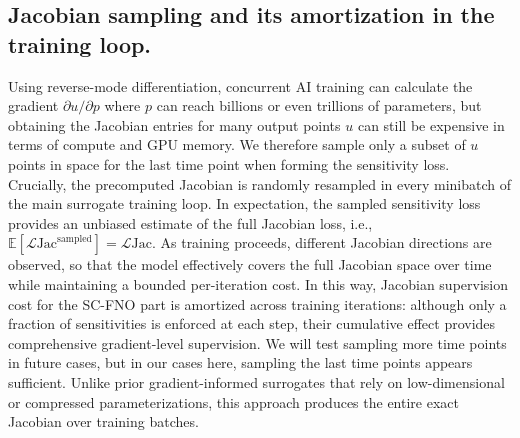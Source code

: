 \subsection{Jacobian sampling and its amortization in the training loop.}
Using reverse-mode differentiation, concurrent AI training can calculate the gradient $\partial u / \partial p$ where $p$ can reach billions or even trillions of parameters, but obtaining the Jacobian entries for many output points $u$ can still be expensive in terms of compute and GPU memory. We therefore sample only a subset of $u$ points in space for the last time point when forming the sensitivity loss. Crucially, the precomputed Jacobian is randomly resampled in every minibatch of the main surrogate training loop. In expectation, the sampled sensitivity loss provides an unbiased estimate of the full Jacobian loss, i.e., $\mathbb{E}[\mathcal{L}{\text{Jac}}^{\text{sampled}}] = \mathcal{L}{\text{Jac}}$. As training proceeds, different Jacobian directions are observed, so that the model effectively covers the full Jacobian space over time while maintaining a bounded per-iteration cost. In this way, Jacobian supervision cost for the SC-FNO part is amortized across training iterations: although only a fraction of sensitivities is enforced at each step, their cumulative effect provides comprehensive gradient-level supervision. We will test sampling more time points in future cases, but in our cases here, sampling the last time points appears sufficient. Unlike prior gradient-informed surrogates that rely on low-dimensional or compressed parameterizations, this approach produces the entire exact Jacobian over training batches.

